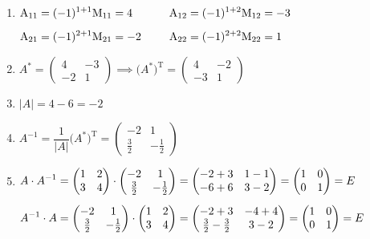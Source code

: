 \documentclass[12pt, a4paper]{report}
\begin{document}
	\begin{enumerate}[1)]
	\item \(\begin{alignedat}[t]{2}&\mathrm{A}_{11}=(-1)^{1+1}\mathrm{M}_{11}=4\hspace{25pt}&&\mathrm{A}_{12}=(-1)^{1+2}\mathrm{M}_{12}=-3\\[5pt]&\mathrm{A}_{21}=(-1)^{2+1}\mathrm{M}_{21}=-2\hspace{25pt}&&\mathrm{A}_{22}=(-1)^{2+2}\mathrm{M}_{22}=1\end{alignedat}\)
	
	\item \(A^{*}=\begin{pmatrix}4&-3\\-2&1\end{pmatrix}\implies \big(A^{*}\big)^{\mathrm{T}}=\begin{pmatrix}4&-2\\-3&1\end{pmatrix}\)
	
	\item \(|A| = 4-6=-2\)
	
	\item \(A^{-1}=\dfrac{1}{|A|}\big(A^{*}\big)^{\mathrm{T}}=\begin{pmatrix}-2&1\\\tfrac{3}{2}&-\tfrac{1}{2}\end{pmatrix}\)
	
	\item \(\begin{alignedat}[t]{1}&A\cdot A^{-1} = \begin{pmatrix}1&2\\3&4\end{pmatrix}\cdot \begin{pmatrix}-2&1\\\tfrac{3}{2}&-\tfrac{1}{2}\end{pmatrix}=\begin{pmatrix}-2+3&1-1\\-6+6&3-2\end{pmatrix}=\begin{pmatrix}1&0\\0&1\end{pmatrix}=E\\[5pt]&A^{-1}\cdot{A}=\begin{pmatrix}-2&1\\\tfrac{3}{2}&-\tfrac{1}{2}\end{pmatrix}\cdot \begin{pmatrix}1&2\\3&4\end{pmatrix}=\begin{pmatrix}-2+3&-4+4\\\tfrac{3}{2}-\tfrac{3}{2}&3-2\end{pmatrix}=\begin{pmatrix}1&0\\0&1\end{pmatrix}=E\end{alignedat}\)
	\end{enumerate}
\end{document}
